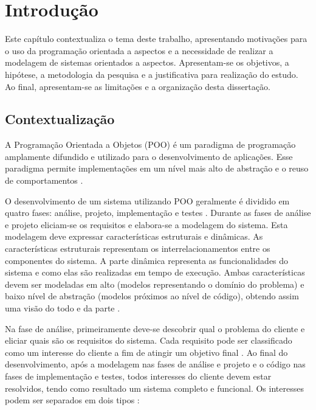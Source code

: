 \chapter{Introdução}

Este capítulo contextualiza o tema deste trabalho, apresentando motivações para o uso da programação orientada a aspectos e a necessidade de realizar
a modelagem de sistemas orientados a aspectos. Apresentam-se os objetivos, a hipótese, a metodologia da pesquisa e a justificativa para realização do
estudo. Ao final, apresentam-se as limitações e a organização desta dissertação.

\section{Contextualização}

A Programação Orientada a Objetos (POO)  é um paradigma de programação amplamente difundido e utilizado
para o desenvolvimento de aplicações. Esse paradigma permite implementações em um nível mais alto de abstração e o reuso de comportamentos
\cite{Laddad:2003:AAP:993468}.

O desenvolvimento de um sistema utilizando POO geralmente é dividido em quatro fases: análise, projeto, implementação e testes
\cite{pressman:01}. Durante as fases de análise e projeto eliciam-se os requisitos e elabora-se a modelagem do sistema. Esta modelagem deve expressar 
características estruturais e dinâmicas. As características estruturais representam os interrelacionamentos entre os componentes do sistema. A parte
dinâmica representa as funcionalidades do sistema e como elas são realizadas em tempo de execução. Ambas características devem ser modeladas em alto 
(modelos representando o domínio do problema) e baixo nível de abstração (modelos próximos ao nível de código), obtendo assim uma visão do todo e da
parte \cite{silva:00}.

Na fase de análise, primeiramente deve-se descobrir qual o problema do cliente e eliciar quais são os requisitos do sistema. Cada requisito
pode ser classificado como um interesse do cliente a fim de atingir um objetivo final \cite{Laddad:2003:AAP:993468}. Ao final do desenvolvimento,
após a modelagem nas fases de análise e projeto e o código nas fases de implementação e testes, todos interesses do cliente devem estar resolvidos, tendo
como resultado um sistema completo e funcional. Os interesses podem ser separados em dois tipos \cite{Laddad:2003:AAP:993468}:

